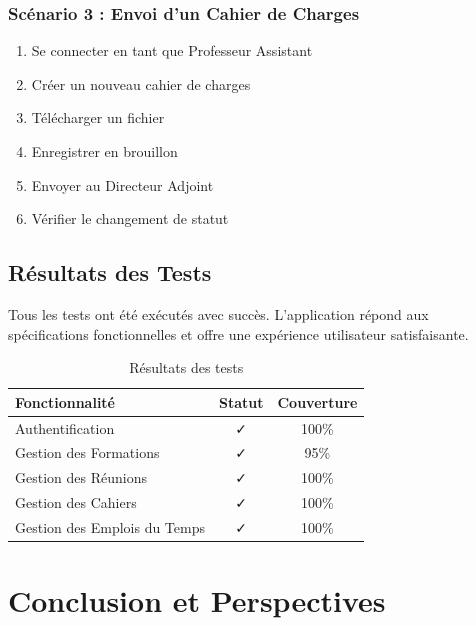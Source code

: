 \documentclass[12pt,a4paper]{report}
\begin{document}
\subsection{Scénario 3 : Envoi d'un Cahier de Charges}

\begin{enumerate}
    \item Se connecter en tant que Professeur Assistant
    \item Créer un nouveau cahier de charges
    \item Télécharger un fichier
    \item Enregistrer en brouillon
    \item Envoyer au Directeur Adjoint
    \item Vérifier le changement de statut
\end{enumerate}

\section{Résultats des Tests}

Tous les tests ont été exécutés avec succès. L'application répond aux spécifications fonctionnelles et offre une expérience utilisateur satisfaisante.

\begin{table}[H]
    \centering
    \begin{tabular}{|l|c|c|}
        \hline
        \textbf{Fonctionnalité} & \textbf{Statut} & \textbf{Couverture} \\
        \hline
        Authentification & ✓ & 100\% \\
        \hline
        Gestion des Formations & ✓ & 95\% \\
        \hline
        Gestion des Réunions & ✓ & 100\% \\
        \hline
        Gestion des Cahiers & ✓ & 100\% \\
        \hline
        Gestion des Emplois du Temps & ✓ & 100\% \\
        \hline
    \end{tabular}
    \caption{Résultats des tests}
    \label{tab:test-results}
\end{table}

\chapter{Conclusion et Perspectives}
\end{document}
